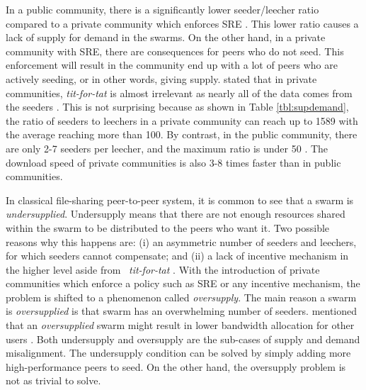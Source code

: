 In a public community, there is a significantly lower seeder/leecher ratio compared to a private community which enforces SRE \cite{2010:pubpriv:meulpolder,2009:demandsupplyres:andrade}. This lower ratio causes a lack of supply for demand in the swarms. On the other hand, in a private community with SRE, there are consequences for peers who do not seed. This enforcement will result in the community end up with a lot of peers who are actively seeding, or in other words, giving supply. \citeauthor{2010:pubpriv:meulpolder} stated that in private communities, \textit{tit-for-tat} is almost irrelevant as nearly all of the data comes from the seeders \cite{2010:pubpriv:meulpolder}. This is not surprising because as shown in Table \ref{tbl:supdemand}, the ratio of seeders to leechers in a private community can reach up to 1589 with the average reaching more than 100. By contrast, in the public community, there are only 2-7 seeders per leecher, and the maximum ratio is under 50 \cite{2010:pubpriv:meulpolder}. The download speed of private communities is also 3-8 times faster than in public communities. 

In classical file-sharing peer-to-peer system, it is common to see that a swarm is \textit{undersupplied}. Undersupply means that there are not enough resources shared within the swarm to be distributed to the peers who want it. Two possible reasons why this happens are: (i) an asymmetric number of seeders and leechers, for which seeders cannot compensate; and (ii) a lack of incentive mechanism in the higher level aside from \bt~\textit{tit-for-tat} \cite{2009:demandsupplyres:andrade}. With the introduction of private communities which enforce a policy such as SRE or any incentive mechanism, the problem is shifted to a phenomenon called \textit{oversupply}. The main reason a swarm is \textit{oversupplied} is that swarm has an overwhelming number of seeders. \citeauthor{2013:survivepriv:jia} mentioned that an \textit{oversupplied} swarm might result in lower bandwidth allocation for other users \cite{2013:survivepriv:jia}. Both undersupply and oversupply are the sub-cases of supply and demand misalignment. The undersupply condition can be solved by simply adding more high-performance peers to seed. On the other hand, the oversupply problem is not as trivial to solve.

